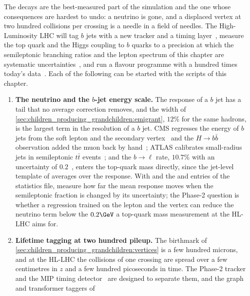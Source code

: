 The decays are the best-measured part of the simulation and the one whose
consequences are hardest to undo: a neutrino is gone, and a displaced
vertex at two hundred collisions per crossing is a needle in a field of
needles. The High-Luminosity LHC will tag $b$ jets with a new tracker and
a timing layer~\cite{CMS:2017lum,Butler:2019rpu}, measure the top quark
and the Higgs coupling to $b$ quarks to a precision at which the
semileptonic branching ratios and the lepton spectrum of this chapter are
systematic uncertainties~\cite{Azzi:2019yne}, and run a flavour programme
with a hundred times today's data~\cite{Cerri:2018ypt}. Each of the
following can be started with the scripts of this chapter.
\begin{enumerate}
  \item \textbf{The neutrino and the $b$-jet energy scale.} The response
    of a $b$ jet has a tail that no average correction removes, and the
    width of \cref{sec:children_producing_grandchildren:emigrant}, $12\%$
    for the same hadrons, is the largest term in the resolution of a $b$
    jet. CMS regresses the energy of $b$ jets from the soft lepton and the
    secondary vertex~\cite{CMS:2019uxx} and the $H\to b\bar b$ observation
    added the muon back by hand~\cite{CMS:2018nsn}; ATLAS calibrates
    small-radius jets in semileptonic $t\bar t$ events~\cite{ATLAS:2025wod};
    and the $b\to\ell$ rate, $10.7\%$ with an uncertainty of
    $0.2$~\cite{HeavyFlavorAveragingGroupHFLAV:2024ctg}, enters the
    top-quark mass directly, since the jet-level template of
    \cite{CMS:2018quc,CMS:2023ebf,ATLAS:2024dxp} averages over
    the response. With  and the  and 
    entries of the statistics file, measure how far the mean response
    moves when the semileptonic fraction is changed by its uncertainty;
    the Phase-2 question is whether a regression trained on the lepton
    and the vertex can reduce the neutrino term below the $0.2\GeV$ a
    top-quark mass measurement at the HL-LHC aims for.
  \item \textbf{Lifetime tagging at two hundred pileup.} The birthmark of
    \cref{sec:children_producing_grandchildren:vertices} is a few hundred
    microns, and at the HL-LHC the collisions of one crossing are spread
    over a few centimetres in $z$ and a few hundred picoseconds in time.
    The Phase-2 tracker~\cite{CMS:2017lum} and the MIP timing
    detector~\cite{Butler:2019rpu} are designed to separate them, and the
    graph and transformer taggers of
    \cite{Bols:2020bkb,Qu:2019gqs,Qu:2022mxj,ATLAS:2022rkn,ATLAS:2025dkv}

\end{enumerate}
